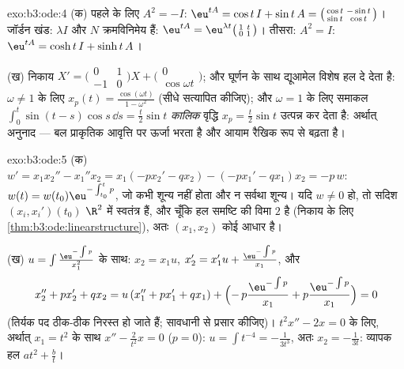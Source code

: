 \begin{solution}{exo:b3:ode:4}
(क) पहले के लिए $A^2 = -I$: $\eu^{tA} = \cos t\,I + \sin
t\,A = \bigl(\begin{smallmatrix}\cos t & -\sin t\\ \sin t &
\cos t\end{smallmatrix}\bigr)$। जॉर्डन खंड: $\lambda I$ और $N$ क्रमविनिमेय
हैं: $\eu^{tA} =
\eu^{\lambda t}\bigl(\begin{smallmatrix}1 & t\\ 0 &
1\end{smallmatrix}\bigr)$। तीसरा: $A^2 = I$: $\eu^{tA} =
\cosh t\,I + \sinh t\,A$।

(ख) निकाय $X' = \bigl(\begin{smallmatrix}0&1\\-1&0
\end{smallmatrix}\bigr)X + \bigl(\begin{smallmatrix}0\\
\cos\omega t\end{smallmatrix}\bigr)$; और घूर्णन  के साथ द्यूआमेल विशेष हल दे देता
है: $\omega \neq 1$ के लिए $x_p(t) = \frac{\cos(\omega t)}{1 -
\omega^2}$ (सीधे सत्यापित कीजिए); और $\omega = 1$ के लिए समाकल
$\int_0^t\sin(t - s)\cos s\,\dd s = \frac t2\sin t$ \emph{कालिक} वृद्धि $x_p = \frac t2\sin t$ उत्पन्न कर देता है: अर्थात् अनुनाद
--- बल प्राकृतिक आवृत्ति पर ऊर्जा भरता है और आयाम रैखिक रूप से बढ़ता
है।
\end{solution}

\begin{solution}{exo:b3:ode:5}
(क) $w' = x_1x_2'' - x_1''x_2 = x_1(-px_2' - qx_2) - (-px_1'
- qx_1)x_2 = -p\,w$: $w(t) = w(t_0)\eu^{-\int_{t_0}^tp}$, जो कभी शून्य नहीं होता और न सर्वथा शून्य। यदि $w \neq 0$
हो, तो सदिश $(x_i, x_i')(t_0)$ $\R^2$ में स्वतंत्र हैं, और चूँकि हल समष्टि की विमा
$2$ है (निकाय के लिए \cref{thm:b3:ode:linearstructure}), अतः $(x_1,
x_2)$ कोई आधार है।

(ख) $u = \int\frac{\eu^{-\int p}}{x_1^2}$ के साथ: $x_2 = x_1u$, $x_2' = x_1'u + \frac{\eu^{-\int p}}{x_1}$, और
\[
x_2'' + px_2' + qx_2
= u\,(x_1'' + px_1' + qx_1) +
\Bigl(-\,p\frac{\eu^{-\int p}}{x_1} +
p\frac{\eu^{-\int p}}{x_1}\Bigr) = 0
\]
(तिर्यक पद ठीक-ठीक निरस्त हो जाते हैं; सावधानी से प्रसार कीजिए)।
$t^2x'' - 2x = 0$ के लिए, अर्थात् $x_1 = t^2$ के साथ $x'' - \frac2{t^2}x = 0$ ($p = 0$): $u = \int t^{-4} = -\frac1{3t^3}$, अतः $x_2
= -\frac1{3t}$: व्यापक
हल $at^2 + \frac bt$।
\end{solution}

